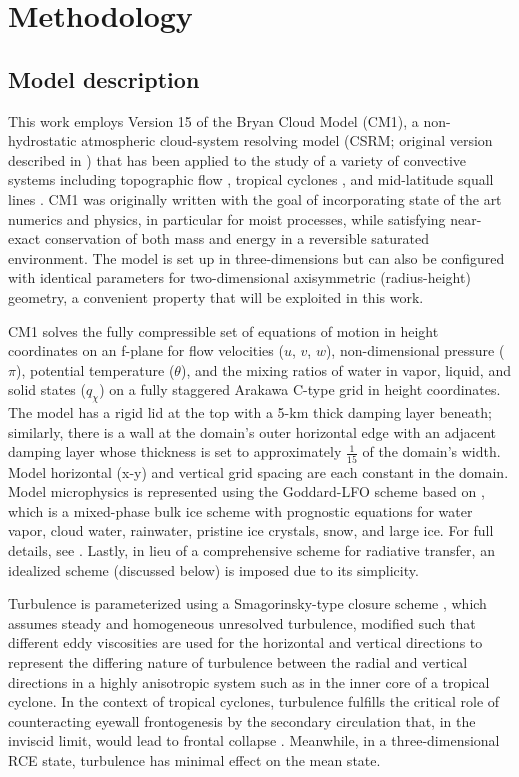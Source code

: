 \documentclass[12pt]{article}
\begin{document}
\section{Methodology}

\subsection{Model description}
This work employs Version 15 of the Bryan Cloud Model (CM1), a non-hydrostatic atmospheric cloud-system resolving model (CSRM; original version described in \cite{Bryan_Fritsch_2002}) that has been applied to the study of a variety of convective systems including topographic flow \citep{Miglietta_Rotunno_2010}, tropical cyclones \citep{Bryan_Rotunno_2009b}, and mid-latitude squall lines \citep{Parker_2008}.  CM1 was originally written with the goal of incorporating state of the art numerics and physics, in particular for moist processes, while satisfying near-exact conservation of both mass and energy in a reversible saturated environment. The model is set up in three-dimensions but can also be configured with identical parameters for two-dimensional axisymmetric (radius-height) geometry, a convenient property that will be exploited in this work.

CM1 solves the fully compressible set of equations of motion in height coordinates on an f-plane for flow velocities ($u$, $v$, $w$), non-dimensional pressure ($\pi$), potential temperature ($\theta$), and the mixing ratios of water in vapor, liquid, and solid states ($q_\chi$) on a fully staggered Arakawa C-type grid in height coordinates. The model has a rigid lid at the top with a 5-km thick damping layer beneath; similarly, there is a wall at the domain's outer horizontal edge with an adjacent damping layer whose thickness is set to approximately $\frac{1}{15}$ of the domain's width.  Model horizontal (x-y) and vertical grid spacing are each constant in the domain. Model microphysics is represented using the Goddard-LFO scheme based on \cite{Lin_Farley_Orville_1983}, which is a mixed-phase bulk ice scheme with prognostic equations for water vapor, cloud water, rainwater, pristine ice crystals, snow, and large ice. For full details, see \cite{Bryan_Fritsch_2002}. Lastly, in lieu of a comprehensive scheme for radiative transfer, an idealized scheme (discussed below) is imposed due to its simplicity.

Turbulence is parameterized using a Smagorinsky-type closure scheme \citep{Smagorinsky_1963}, which assumes steady and homogeneous unresolved turbulence, modified such that different eddy viscosities are used for the horizontal and vertical directions to represent the differing nature of turbulence between the radial and vertical directions in a highly anisotropic system such as in the inner core of a tropical cyclone.  In the context of tropical cyclones, turbulence fulfills the critical role of counteracting eyewall frontogenesis by the secondary circulation that, in the inviscid limit, would lead to frontal collapse \citep{Emanuel_1997}.  Meanwhile, in a three-dimensional RCE state, turbulence has minimal effect on the mean state.
\end{document}
